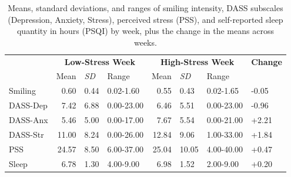 \documentclass[authordate, empirical,issue]{jote-new-article}
\begin{document}
\begin{table}[b]
  \begin{fullwidth}
    \caption{Means, standard deviations, and ranges of smiling intensity, DASS subscales (Depression, Anxiety, Stress), perceived stress (PSS), and self-reported sleep quantity in hours (PSQI) by week, plus the change in the means across weeks.}
    \begin{tabularx}{\linewidth}{@{} X r l l r l l l @{}}
      \toprule
               & \multicolumn{3}{c}{\textbf{Low-Stress Week}} & \multicolumn{3}{c}{\textbf{High-Stress Week}}
               & \textbf{Change}                                                                                                                                      \\


               & Mean                                         & \textit{SD}                                   & Range      & Mean  & \textit{SD} & Range      &       \\
      \midrule

      Smiling  & 0.60                                         & 0.44                                          & 0.02-1.60  & 0.55  & 0.43        & 0.02-1.65  & -0.05 \\

      DASS-Dep & 7.42                                         & 6.88                                          & 0.00-23.00 & 6.46  & 5.51        & 0.00-23.00 & -0.96 \\

      DASS-Anx & 5.46                                         & 5.00                                          & 0.00-17.00 & 7.67  & 5.54        & 0.00-21.00 & +2.21 \\

      DASS-Str & 11.00                                        & 8.24                                          & 0.00-26.00 & 12.84 & 9.06        & 1.00-33.00 & +1.84
      \\

      PSS      & 24.57                                        & 8.50                                          & 6.00-37.00 & 25.04 & 10.05       & 4.00-40.00 & +0.47 \\

      Sleep    & 6.78                                         & 1.30                                          & 4.00-9.00  & 6.98  & 1.52        & 2.00-9.00  & +0.20 \\
      \bottomrule
    \end{tabularx}
  \end{fullwidth}
\end{table}
\end{document}
